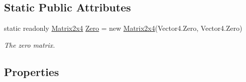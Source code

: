 \subsection*{Static Public Attributes}
\begin{DoxyCompactItemize}
\item 
static readonly \hyperlink{struct_open_t_k_1_1_matrix2x4}{Matrix2x4} \hyperlink{struct_open_t_k_1_1_matrix2x4_aaf9cf3de1c8358e46f5839dca3dc555d}{Zero} = new \hyperlink{struct_open_t_k_1_1_matrix2x4}{Matrix2x4}(Vector4.\-Zero, Vector4.\-Zero)
\begin{DoxyCompactList}\small\item\em The zero matrix. \end{DoxyCompactList}\end{DoxyCompactItemize}
\subsection*{Properties}

